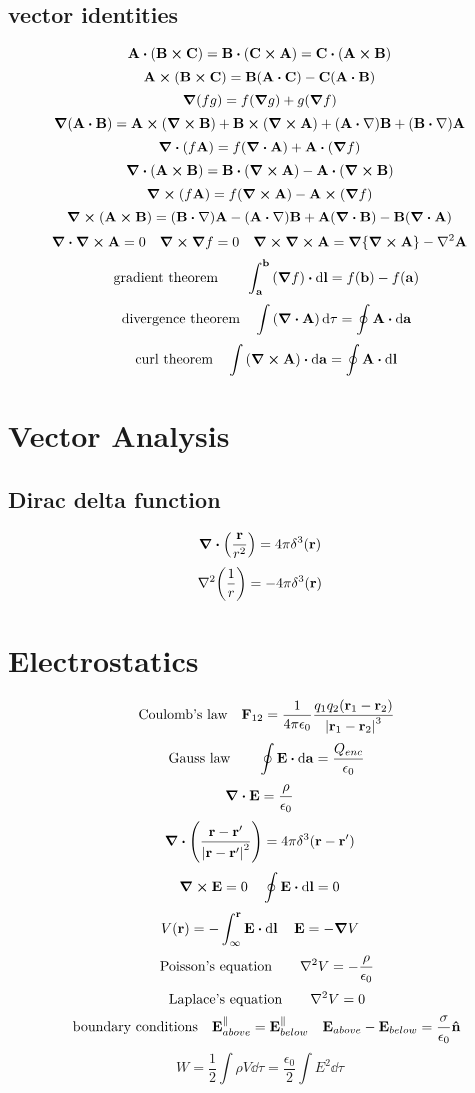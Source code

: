 \documentclass[12pt]{article}
\begin{document}
\subsection*{vector identities}
\[\vb{A}\vdot\qty(\vb{B}\cp\vb{C})=\vb{B}\vdot\qty(\vb{C}\cp\vb{A})=\vb{C}\vdot\qty(\vb{A}\cp\vb{B})\]
\[\vb{A}\cp\qty(\vb{B}\cp\vb{C})=\vb{B}\qty(\vb{A}\vdot\vb{C})-\vb{C}\qty(\vb{A}\vdot\vb{B})\]
\[\grad{(fg)}=f(\grad{g})+g(\grad{f})\]
\[\grad{(\vb{A}\vdot\vb{B})}=\vb{A}\cp\qty(\curl{\vb{B}})+\vb{B}\cp\qty(\curl{\vb{A}})+\qty(\vb{A}\vdot\nabla)\vb{B}+\qty(\vb{B}\vdot\nabla)\vb{A}\]
\[\div{\qty(f\vb{A})}=f(\div{\vb{A}})+\vb{A}\vdot\qty(\grad{f})\]
\[\div{\qty(\vb{A}\cp\vb{B})}=\vb{B}\vdot\qty(\curl{\vb{A}})-\vb{A}\vdot\qty(\curl{\vb{B}})\]
\[\curl{\qty(f\vb{A})}=f(\curl{\vb{A}})-\vb{A}\cp\qty(\grad{f})\]
\[\curl{(\vb{A}\cp\vb{B})}=\qty(\vb{B}\vdot\nabla)\vb{A}-\qty(\vb{A}\vdot\nabla)\vb{B}+\vb{A}\qty(\div{\vb{B}})-\vb{B}\qty(\div{\vb{A}})\]
\[\div{\curl{\vb{A}}}=0\quad\curl{\grad{f}}=0\quad\curl{\curl{\vb{A}}}=\grad\qty{\curl{\vb{A}}}-\laplacian{\vb{A}}\]
\[\qq{gradient theorem}\quad \int_{\vb{a}}^{\vb{b}}\qty(\grad{f})\vdot\dd{\vb{l}}=f(\vb{b})-f(\vb{a})\]
\[\qq{divergence theorem} \int\qty(\div{\vb{A}})\dd{\tau}=\oint\vb{A}\vdot\dd{\vb{a}}\]
\[\qq{curl theorem} \int\qty(\curl{\vb{A}})\vdot\dd{\vb{a}}=\oint\vb{A}\vdot\dd{\vb{l}}\]
\section*{Vector Analysis}
\subsection*{Dirac delta function}
\[\div{\qty(\frac{\vb{r}}{r^2})}=4\pi\delta^3(\vb{r})\]
\[\laplacian{\qty(\frac{1}{r})}=-4\pi\delta^3(\vb{r})\]
\section*{Electrostatics}
\[\qq{Coulomb's law}\vb{F}_{12}=\frac{1}{4\pi\epsilon_0}\frac{q_1q_2(\vb{r}_1-\vb{r}_2)}{\vqty{\vb{r}_1-\vb{r}_2}^3}\]
\[\qq{Gauss law}\quad \oint\vb{E}\vdot\dd{\vb{a}}=\frac{Q_{enc}}{\epsilon_0}\]
\[\div{\vb{E}}=\frac{\rho}{\epsilon_0}\]
\[\div{\qty(\frac{\vb{r}-\vb{r}'}{\vqty{\vb{r}-\vb{r}'}^2})}=4\pi\delta^3(\vb{r}-\vb{r}')\]
\[\curl{\vb{E}}=0\quad \oint\vb{E}\vdot\dd{\vb{l}}=0\]
\[V(\vb{r})=-\int_{\infty}^{\vb{r}}\vb{E}\vdot\dd{\vb{l}}\quad\vb{E}=-\grad{V}\]
\[\qq{Poisson's equation}\quad\laplacian{V}=-\frac{\rho}{\epsilon_0}\]
\[\qq{Laplace's equation} \quad\laplacian{V}=0\]
\[\qq{boundary conditions} \vb{E}^{\parallel}_{above}=\vb{E}^{\parallel}_{below}\quad \vb{E}_{above}-\vb{E}_{below}=\frac{\sigma}{\epsilon_0}\vu{n} \]
\[W=\frac{1}{2}\int\rho{V}\dd{\tau}=\frac{\epsilon_0}{2}\int{E^2}\dd\tau\]
\end{document}
